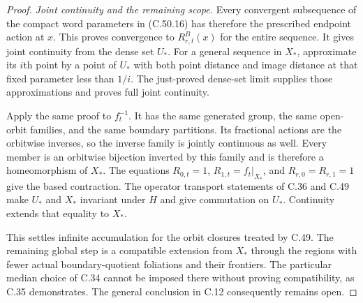 \begin{proof}
\emph{Joint continuity and the remaining scope.}
Every convergent subsequence of the compact word
parameters in (C.50.16) has therefore the prescribed
endpoint action at $x$. This proves convergence to
$R^B_{r,t}(x)$ for the entire sequence.
It gives joint continuity from the dense set $U_*$.
For a general sequence in $X_*$, approximate its
$i$th point by a point of $U_*$ with both point distance
and image distance at that fixed parameter less than
$1/i$. The just-proved dense-set limit supplies those
approximations and proves full joint continuity.

Apply the same proof to $f_t^{-1}$.
It has the same generated group, the same open-orbit
families, and the same boundary partitions.
Its fractional actions are the orbitwise inverses,
so the inverse family is jointly continuous as well.
Every member is an orbitwise bijection inverted by
this family and is therefore a homeomorphism of $X_*$.
The equations
$R_{0,t}=1$, $R_{1,t}=f_t|_{X_*}$, and
$R_{r,0}=R_{r,1}=1$ give the based contraction.
The operator transport statements of C.36 and C.49
make $U_*$ and $X_*$ invariant under $H$ and give
commutation on $U_*$. Continuity extends that equality
to $X_*$.

This settles infinite accumulation for the orbit closures
treated by C.49. The remaining global step is a compatible
extension from $X_*$ through the regions with fewer
actual boundary-quotient foliations and their frontiers.
The particular median choice of C.34 cannot be imposed
there without proving compatibility, as C.35 demonstrates.
The general conclusion in C.12 consequently remains open.
\end{proof}
